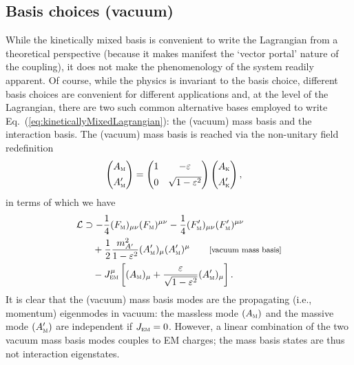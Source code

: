 \documentclass[amsmath,amssymb,aps,10pt,prd,letterpaper,nofootinbib,balancelastpage,notitlepage,superscriptaddress,twocolumn,floatfix]{revtex4-2}
\renewcommand{\eqref}[2][]{Eq{#1}.~(\ref{eq:#2})}	%
\newcommand{\lb}{\ensuremath{\left}}					%
\newcommand{\rb}{\ensuremath{\right}}					%
\newcommand{\nl}{\nonumber \\ & \quad }					%
\newcommand{\LL}{\mathcal{L}}
\newcommand{\mass}[1]{({#1}_{\textsc{m}})}
\newcommand{\primemass}[1]{({#1}_{\textsc{m}}^\prime)}
\begin{document}
\subsection{Basis choices (vacuum)}
\label{app:basisChoices}

While the kinetically mixed basis is convenient to write the Lagrangian from a theoretical perspective (because it makes manifest the `vector portal' nature of the coupling), it does not make the phenomenology of the system readily apparent.
Of course, while the physics is invariant to the basis choice, different basis choices are convenient for different applications and, at the level of the Lagrangian, there are two such common alternative bases employed to write \eqref{kineticallyMixedLagrangian}: the (vacuum) mass basis and the interaction basis.
The (vacuum) mass basis is reached via the non-unitary field redefinition
\begin{align}
    \begin{pmatrix}
    A_{\textsc{m}} \\[1ex]
    A_{\textsc{m}}'  
    \end{pmatrix}
    &= \begin{pmatrix}
        1 & -\varepsilon \\[1ex]
        0 & \sqrt{1-\varepsilon^2}
    \end{pmatrix}
    \begin{pmatrix}
   A_{\textsc{k}} \\[1ex]
   A_{\textsc{k}}'
    \end{pmatrix},
    \label{eq:kineticTOmass}
\end{align}
in terms of which we have
\begin{align}
    \LL &\supset - \frac{1}{4} \mass{F}_{\mu\nu}\mass{F}^{\mu\nu} - \frac{1}{4} \primemass{F}_{\mu\nu} \primemass{F}^{\mu\nu} \nl
    + \frac{1}{2} \frac{m_{A'}^2}{1-\varepsilon^2} \primemass{A}_\mu \primemass{A}^{\mu} \qquad \text{\footnotesize[vacuum mass basis]} \nl
    - J_{\textsc{em}}^\mu \lb[ \mass{A}_\mu + \dfrac{\varepsilon}{\sqrt{1-\varepsilon^2}} \primemass{A}_\mu \rb].  
    \label{eq:massBasisLagrangianApp}
\end{align}
It is clear that the (vacuum) mass basis modes are the propagating (i.e., momentum) eigenmodes in vacuum: the massless mode $\mass{A}$ and the massive mode $\primemass{A}$ are independent if $J_{\textsc{em}} = 0$.
However, a linear combination of the two vacuum mass basis modes couples to EM charges; the mass basis states are thus not interaction eigenstates.
\end{document}
